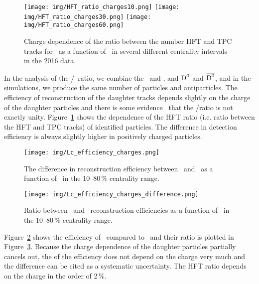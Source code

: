 \begin{figure}[!htb]
\centering
\texttt{[image: img/HFT\_ratio\_charges10.png]}
\texttt{[image: img/HFT\_ratio\_charges30.png]}
\texttt{[image: img/HFT\_ratio\_charges60.png]}
\caption[Charge dependence of the ratio between the number HFT and TPC tracks in the 2016 data.]{\label{HFT_ratio_charge} Charge dependence of the ratio between the number HFT and TPC tracks for \pKandpi\ as a function of \pt\ in several different centrality intervals in the 2016 data.}
\end{figure}

In the analysis of the \Lambdac/\dzero\ ratio, we combine the \Lcplus\ and \LcminusBar, and ${\text{D}^0}$ and $\overline{{\text{D}^0}}$, and in the simulations, we produce the same number of particles and antiparticles. The efficiency of reconstruction of the daughter tracks depends slightly on the charge of the daughter particles and there is some evidence~\cite{D0paper} that the \Lcminus/\Lcplus ratio is not exactly unity. Figure~\ref{HFT_ratio_charge} shows the dependence of the HFT ratio (i.e. ratio between the HFT and TPC tracks) of identified particles. The difference in detection efficiency is always slightly higher in positively charged particles.

\begin{figure}[!htb]
\centering
\texttt{[image: img/Lc\_efficiency\_charges.png]}

\caption[The difference in reconstruction efficiency between \Lcplus\ and \Lcminus.]{\label{Lc_eff_charge} The difference in reconstruction efficiency between \Lcplus\ and \Lcminus\ as a function of \pt\ in the 10--80$\,\%$ centrality range.}
\end{figure}


\begin{figure}[!htb]
\centering
\texttt{[image: img/Lc\_efficiency\_charges\_difference.png]}

\caption[Ratio between \Lcplus\ and \Lcminus\ reconstruction efficiencies.]{\label{Lc_eff_ratio_charge} Ratio between \Lcplus\ and \Lcminus\ reconstruction efficiencies as a function of \pt\ in the 10--80$\,\%$ centrality range.}
\end{figure}

Figure~\ref{Lc_eff_charge} shows the efficiency of \Lcplus\ compared to \Lcminus\ and their ratio is plotted in Figure~\ref{Lc_eff_ratio_charge}\@. Because the charge dependence of the daughter particles partially cancels out, the of the efficiency does not depend on the charge very much and the difference can be cited as a systematic uncertainty.
The HFT ratio depends on the charge in the order of 2$\,\%$. 


